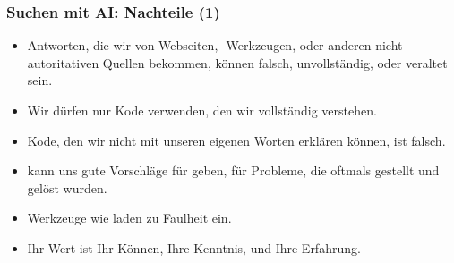 \documentclass[aspectratio=169,mathserif,notheorems]{beamer}%
\begin{document}
%
%
\begin{frame}%
\frametitle{Suchen mit AI: Nachteile (1)}%
\begin{itemize}%
%
\item Antworten, die wir von Webseiten, -Werkzeugen, oder anderen nicht-autoritativen Quellen bekommen, können falsch, unvollständig, oder veraltet sein.%
%
\item<2-> Wir dürfen nur Kode verwenden, den wir vollständig verstehen.%
%
\item<4-> Kode, den wir nicht mit unseren eigenen Worten erklären können, ist \alert{falsch}.%
%
\item<5->  kann uns gute Vorschläge für  geben, für Probleme, die oftmals gestellt und gelöst wurden.%
%
\item<7-> Werkzeuge wie  laden zu Faulheit ein.%
%
\item<8-> Ihr Wert ist Ihr Können, Ihre Kenntnis, und Ihre Erfahrung.%
%
%
\end{itemize}%
%
\end{frame}%
%
%
\end{document}

